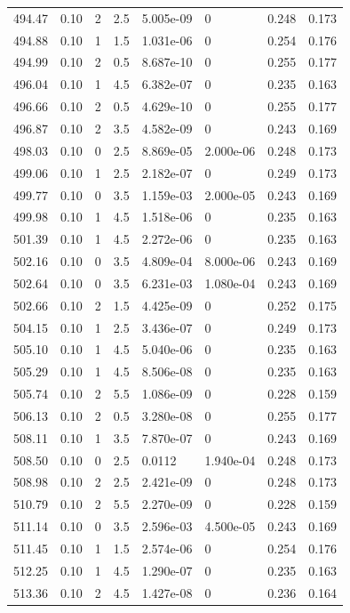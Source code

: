 \documentclass[preview]{standalone}
\begin{document}
{{{{{{{{\begin{tabular}{L{1.2cm}C{1.2cm} C{0.3cm}C{0.5cm} C{1.4cm}C{1.4cm} C{1.4cm}C{1.4cm}}
  494.47  &  0.10  & 2     & 2.5 &  5.005e-09  & 0  & 0.248 &  0.173   \\ 
  494.88  &  0.10  & 1     & 1.5 &  1.031e-06  & 0  & 0.254 &  0.176   \\ 
  494.99  &  0.10  & 2     & 0.5 &  8.687e-10  & 0  & 0.255 &  0.177   \\ 
  496.04  &  0.10  & 1     & 4.5 &  6.382e-07  & 0  & 0.235 &  0.163   \\ 
  496.66  &  0.10  & 2     & 0.5 &  4.629e-10  & 0  & 0.255 &  0.177   \\ 
  496.87  &  0.10  & 2     & 3.5 &  4.582e-09  & 0  & 0.243 &  0.169   \\ 
  498.03  &  0.10  & 0     & 2.5 &  8.869e-05  & 2.000e-06  & 0.248 &  0.173   \\ 
  499.06  &  0.10  & 1     & 2.5 &  2.182e-07  & 0  & 0.249 &  0.173   \\ 
  499.77  &  0.10  & 0     & 3.5 &  1.159e-03  & 2.000e-05  & 0.243 &  0.169   \\ 
  499.98  &  0.10  & 1     & 4.5 &  1.518e-06  & 0  & 0.235 &  0.163   \\ 
  501.39  &  0.10  & 1     & 4.5 &  2.272e-06  & 0  & 0.235 &  0.163   \\ 
  502.16  &  0.10  & 0     & 3.5 &  4.809e-04  & 8.000e-06  & 0.243 &  0.169   \\ 
  502.64  &  0.10  & 0     & 3.5 &  6.231e-03  & 1.080e-04  & 0.243 &  0.169   \\ 
  502.66  &  0.10  & 2     & 1.5 &  4.425e-09  & 0  & 0.252 &  0.175   \\ 
  504.15  &  0.10  & 1     & 2.5 &  3.436e-07  & 0  & 0.249 &  0.173   \\ 
  505.10  &  0.10  & 1     & 4.5 &  5.040e-06  & 0  & 0.235 &  0.163   \\ 
  505.29  &  0.10  & 1     & 4.5 &  8.506e-08  & 0  & 0.235 &  0.163   \\ 
  505.74  &  0.10  & 2     & 5.5 &  1.086e-09  & 0  & 0.228 &  0.159   \\ 
  506.13  &  0.10  & 2     & 0.5 &  3.280e-08  & 0  & 0.255 &  0.177   \\ 
  508.11  &  0.10  & 1     & 3.5 &  7.870e-07  & 0  & 0.243 &  0.169   \\ 
  508.50  &  0.10  & 0     & 2.5 &  0.0112  & 1.940e-04  & 0.248 &  0.173   \\ 
  508.98  &  0.10  & 2     & 2.5 &  2.421e-09  & 0  & 0.248 &  0.173   \\ 
  510.79  &  0.10  & 2     & 5.5 &  2.270e-09  & 0  & 0.228 &  0.159   \\ 
  511.14  &  0.10  & 0     & 3.5 &  2.596e-03  & 4.500e-05  & 0.243 &  0.169   \\ 
  511.45  &  0.10  & 1     & 1.5 &  2.574e-06  & 0  & 0.254 &  0.176   \\ 
  512.25  &  0.10  & 1     & 4.5 &  1.290e-07  & 0  & 0.235 &  0.163   \\ 
  513.36  &  0.10  & 2     & 4.5 &  1.427e-08  & 0  & 0.236 &  0.164   \\ 
\hline 
\end{tabular} 

}}}}}}}}
\end{document}
